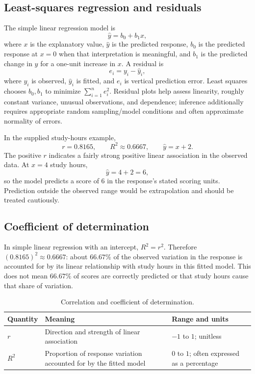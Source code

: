 \documentclass[11pt]{article}
\begin{document}
\subsection{Least-squares regression and residuals}
The simple linear regression model is
\begin{equation}\label{eq:regline}
\widehat y=b_0+b_1x,
\end{equation}
where $x$ is the explanatory value, $\widehat y$ is the predicted response,
$b_0$ is the predicted response at $x=0$ when that interpretation is
meaningful, and $b_1$ is the predicted change in $y$ for a one-unit increase
in $x$.  A residual is
\begin{equation}
e_i=y_i-\widehat y_i,
\end{equation}
where $y_i$ is observed, $\widehat y_i$ is fitted, and $e_i$ is vertical
prediction error.  Least squares chooses $b_0,b_1$ to minimize
$\sum_{i=1}^{n}e_i^2$.  Residual plots help assess linearity, roughly constant
variance, unusual observations, and dependence; inference additionally
requires appropriate random sampling/model conditions and often approximate
normality of errors.

In the supplied study-hours example,
\[
r=0.8165,\qquad R^2\approx0.6667,\qquad \widehat y=x+2.
\]
The positive $r$ indicates a fairly strong positive linear association in
the observed data.  At $x=4$ study hours,
\[
\widehat y=4+2=6,
\]
so the model predicts a score of $6$ in the response's stated scoring units.
Prediction outside the observed range would be extrapolation and should be
treated cautiously.

\subsection{Coefficient of determination}
In simple linear regression with an intercept, $R^2=r^2$.  Therefore
$(0.8165)^2\approx0.6667$: about $66.67\%$ of the observed variation in the
response is accounted for by its linear relationship with study hours in
this fitted model.  This does not mean $66.67\%$ of scores are correctly
predicted or that study hours cause that share of variation.

\begin{table}[ht]
\centering
\caption{Correlation and coefficient of determination.}
\begin{tabularx}{\textwidth}{@{}lYY@{}}
\toprule
Quantity & Meaning & Range and units \\
\midrule
$r$ & Direction and strength of linear association & $-1$ to $1$; unitless \\
$R^2$ & Proportion of response variation accounted for by the fitted model & $0$ to $1$; often expressed as a percentage \\
\bottomrule
\end{tabularx}
\end{table}
\end{document}
